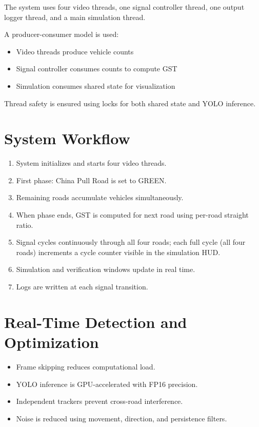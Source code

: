 The system uses four video threads, one signal controller thread, one output logger thread, and a main simulation thread.

A producer-consumer model is used:
\begin{itemize}
    \item Video threads produce vehicle counts
    \item Signal controller consumes counts to compute GST
    \item Simulation consumes shared state for visualization
\end{itemize}

Thread safety is ensured using locks for both shared state and YOLO inference.

\section{System Workflow}

\begin{enumerate}
    \item System initializes and starts four video threads.
    \item First phase: China Pull Road is set to GREEN.
    \item Remaining roads accumulate vehicles simultaneously.
    \item When phase ends, GST is computed for next road using per-road straight ratio.
    \item Signal cycles continuously through all four roads; each full cycle (all four roads) increments a cycle counter visible in the simulation HUD.
    \item Simulation and verification windows update in real time.
    \item Logs are written at each signal transition.
\end{enumerate}

\section{Real-Time Detection and Optimization}

\begin{itemize}
    \item Frame skipping reduces computational load.
    \item YOLO inference is GPU-accelerated with FP16 precision.
    \item Independent trackers prevent cross-road interference.
    \item Noise is reduced using movement, direction, and persistence filters.
\end{itemize}

